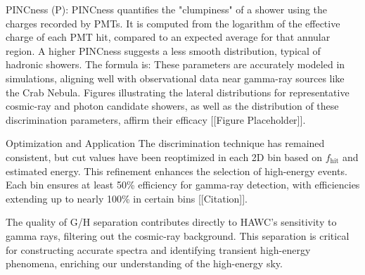 PINCness (P): PINCness quantifies the "clumpiness" of a shower using the charges recorded by PMTs. It is computed from the logarithm of the effective charge of each PMT hit, compared to an expected average for that annular region. A higher PINCness suggests a less smooth distribution, typical of hadronic showers. The formula is:
\pincness
These parameters are accurately modeled in simulations, aligning well with observational data near gamma-ray sources like the Crab Nebula. Figures illustrating the lateral distributions for representative cosmic-ray and photon candidate showers, as well as the distribution of these discrimination parameters, affirm their efficacy [[Figure Placeholder]].

Optimization and Application
The discrimination technique has remained consistent, but cut values have been reoptimized in each 2D bin based on $f_{\text{hit}}$ and estimated energy. This refinement enhances the selection of high-energy events. Each bin ensures at least 50\% efficiency for gamma-ray detection, with efficiencies extending up to nearly 100\% in certain bins [[Citation]].

The quality of G/H separation contributes directly to HAWC's sensitivity to gamma rays, filtering out the cosmic-ray background. This separation is critical for constructing accurate spectra and identifying transient high-energy phenomena, enriching our understanding of the high-energy sky.